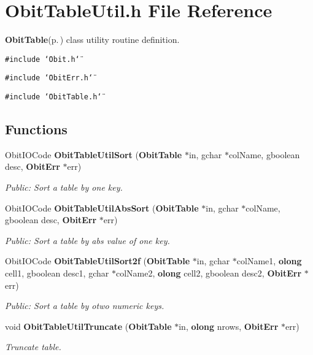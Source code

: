 \section{Obit\-Table\-Util.h File Reference}
\label{ObitTableUtil_8h}
{\bf Obit\-Table}{\rm (p.\,\pageref{structObitTable})} class utility routine definition. 

{\tt \#include \char`\"{}Obit.h\char`\"{}}\par
{\tt \#include \char`\"{}Obit\-Err.h\char`\"{}}\par
{\tt \#include \char`\"{}Obit\-Table.h\char`\"{}}\par
\subsection*{Functions}
\begin{CompactItemize}
\item 
Obit\-IOCode {\bf Obit\-Table\-Util\-Sort} ({\bf Obit\-Table} $\ast$in, gchar $\ast$col\-Name, gboolean desc, {\bf Obit\-Err} $\ast$err)
\begin{CompactList}\small\item\em Public: Sort a table by one key. \item\end{CompactList}\item 
Obit\-IOCode {\bf Obit\-Table\-Util\-Abs\-Sort} ({\bf Obit\-Table} $\ast$in, gchar $\ast$col\-Name, gboolean desc, {\bf Obit\-Err} $\ast$err)
\begin{CompactList}\small\item\em Public: Sort a table by abs value of one key. \item\end{CompactList}\item 
Obit\-IOCode {\bf Obit\-Table\-Util\-Sort2f} ({\bf Obit\-Table} $\ast$in, gchar $\ast$col\-Name1, {\bf olong} cell1, gboolean desc1, gchar $\ast$col\-Name2, {\bf olong} cell2, gboolean desc2, {\bf Obit\-Err} $\ast$err)
\begin{CompactList}\small\item\em Public: Sort a table by otwo numeric keys. \item\end{CompactList}\item 
void {\bf Obit\-Table\-Util\-Truncate} ({\bf Obit\-Table} $\ast$in, {\bf olong} nrows, {\bf Obit\-Err} $\ast$err)
\begin{CompactList}\small\item\em Truncate table. \item\end{CompactList}\end{CompactItemize}


